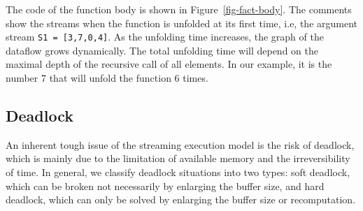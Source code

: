 
The code of the function body is shown in Figure~\ref{fig-fact-body}. 
The comments show the streams when the function is unfolded at its first time, i.e, the argument stream \texttt{S1 = [3,7,0,4]}. 
As the unfolding time increases, the graph of the dataflow grows dynamically. 
The total unfolding time will depend on the maximal depth of the recursive call of all elements. 
In our example, it is the number 7 that will unfold the function 6 times.\\



\subsection{Deadlock}
An inherent tough issue of the streaming execution model is the risk of deadlock, which is mainly due to the limitation of available memory and the irreversibility of time.
In general, we classify deadlock situations into two types: soft deadlock, which can be broken not necessarily by enlarging the buffer size, and hard deadlock, which can only be solved by enlarging the buffer size or recomputation. 

